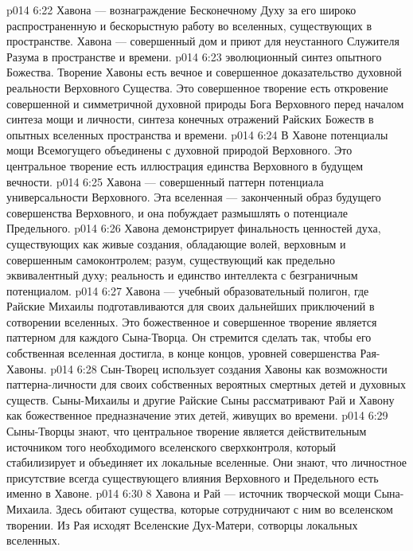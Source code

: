 \vs p014 6:22 Хавона --- вознаграждение Бесконечному Духу за его широко распространенную и бескорыстную работу во вселенных, существующих в пространстве. Хавона --- совершенный дом и приют для неустанного Служителя Разума в пространстве и времени.
\vs p014 6:23 \pc {}\bibnobreakspace {} эволюционный синтез опытного Божества. Творение Хавоны есть вечное и совершенное доказательство духовной реальности Верховного Существа. Это совершенное творение есть откровение совершенной и симметричной духовной природы Бога Верховного перед началом синтеза мощи и личности, синтеза конечных отражений Райских Божеств в опытных вселенных пространства и времени.
\vs p014 6:24 В Хавоне потенциалы мощи Всемогущего объединены с духовной природой Верховного. Это центральное творение есть иллюстрация единства Верховного в будущем вечности.
\vs p014 6:25 Хавона --- совершенный паттерн потенциала универсальности Верховного. Эта вселенная --- законченный образ будущего совершенства Верховного, и она побуждает размышлять о потенциале Предельного.
\vs p014 6:26 Хавона демонстрирует финальность ценностей духа, существующих как живые создания, обладающие волей, верховным и совершенным самоконтролем; разум, существующий как предельно эквивалентный духу; реальность и единство интеллекта с безграничным потенциалом.
\vs p014 6:27 \pc {}\bibnobreakspace {} Хавона --- учебный образовательный полигон, где Райские Михаилы подготавливаются для своих дальнейших приключений в сотворении вселенных. Это божественное и совершенное творение является паттерном для каждого Сына\hyp{}Творца. Он стремится сделать так, чтобы его собственная вселенная достигла, в конце концов, уровней совершенства Рая\hyp{}Хавоны.
\vs p014 6:28 Сын\hyp{}Творец использует создания Хавоны как возможности паттерна\hyp{}личности для своих собственных вероятных смертных детей и духовных существ. Сыны\hyp{}Михаилы и другие Райские Сыны рассматривают Рай и Хавону как божественное предназначение этих детей, живущих во времени.
\vs p014 6:29 Сыны\hyp{}Творцы знают, что центральное творение является действительным источником того необходимого вселенского сверхконтроля, который стабилизирует и объединяет их локальные вселенные. Они знают, что личностное присутствие всегда существующего влияния Верховного и Предельного есть именно в Хавоне.
\vs p014 6:30 8 Хавона и Рай --- источник творческой мощи Сына\hyp{}Михаила. Здесь обитают существа, которые сотрудничают с ним во вселенском творении. Из Рая исходят Вселенские Дух\hyp{}Матери, сотворцы локальных вселенных.
